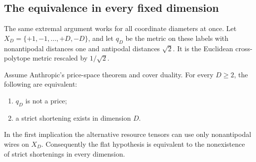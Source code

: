 \subsection{The equivalence in every fixed dimension}
The same extremal argument works for all coordinate diameters at once. Let $X_D=\{+1,-1,\ldots,+D,-D\}$, and let $q_D$ be the metric on these labels with nonantipodal distances one and antipodal distances $\sqrt2$. It is the Euclidean cross-polytope metric rescaled by $1/\sqrt2$.

\begin{theorem}\label{thm:crosspolytope-shortening}
Assume Anthropic's price-space theorem and cover duality. For every $D\geq2$, the following are equivalent:
\begin{enumerate}
\item $q_D$ is not a price;
\item a strict shortening exists in dimension $D$.
\end{enumerate}
In the first implication the alternative resource tensors can use only nonantipodal wires on $X_D$. Consequently the flat hypothesis is equivalent to the nonexistence of strict shortenings in every dimension.
\end{theorem}
